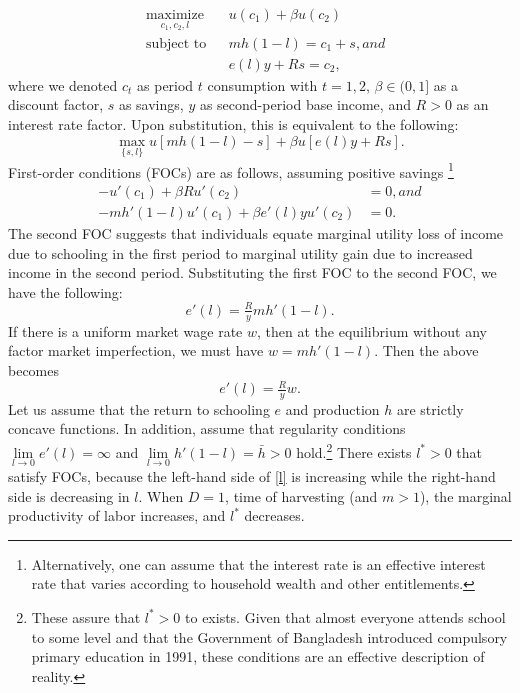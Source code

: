 \documentclass[12pt,letterpaper]{article}
\newcommand{\0}{\ensuremath{\mbox{\boldmath $0$}}}
\begin{document}
\begin{equation}
\begin{aligned}
& \underset{c_{1}, c_{2}, l}{\text{maximize}}
& &  u(c_{1}) + \beta u(c_{2}) \\
& \text{subject to}
& & mh(1-l)=c_{1}+s, and \\
& & & e(l)y+Rs= c_{2},
\end{aligned}
\label{umax}
\end{equation}
where we denoted $c_{t}$ as period $t$ consumption with $t=1,2$, $\beta\in(0, 1]$ as a discount factor, $s$ as savings, $y$ as second-period base income, and $R>0$ as an interest rate factor. Upon substitution, this is equivalent to the following:
\[
\max_{\{s, l\}} u[mh(1-l) - s] + \beta u[e(l)y+Rs].
\]
First-order conditions (FOCs) are as follows, assuming positive savings \footnote{Alternatively, one can assume that the interest rate is an effective interest rate that varies according to household wealth and other entitlements.}
\[
\begin{aligned}
-u'(c_{1})+\beta R u'(c_{2}) &= 0, and \\
-mh'(1-l)u'(c_{1})+\beta e'(l)y u'(c_{2}) &= 0.
\end{aligned}
\]
The second FOC suggests that individuals equate marginal utility loss of income due to schooling in the first period to marginal utility gain due to increased income in the second period. Substituting the first FOC to the second FOC, we have the following:
\begin{equation}
e'(l)  = \tfrac{R}{y}mh'(1-l).
\label{l}
\end{equation}
If there is a uniform market wage rate $w$, then at the equilibrium without any factor market imperfection, we must have $w=mh'(1-l)$. Then the above becomes
\begin{equation}
e'(l)  = \tfrac{R}{y}w.
\label{l'}
\end{equation}
Let us assume that the return to schooling $e$ and production $h$ are strictly concave functions. In addition, assume that regularity conditions $\lim\limits_{l\rightarrow 0}e'(l) = \infty$ and $\lim\limits_{l\rightarrow 0}h'(1-l) = \bar{h}>0$ hold.\footnote{These assure that $l^{*}>0$ to exists. Given that almost everyone attends school to some level and that the Government of Bangladesh introduced compulsory primary education in 1991, these conditions are an effective description of reality. } There exists $l^{*}>0$ that satisfy FOCs, because the left-hand side of \eqref{l} is increasing while the right-hand side is decreasing in $l$. When $D=1$, time of harvesting (and $m>1$), the marginal productivity of labor increases, and $l^{*}$ decreases.
\end{document}
